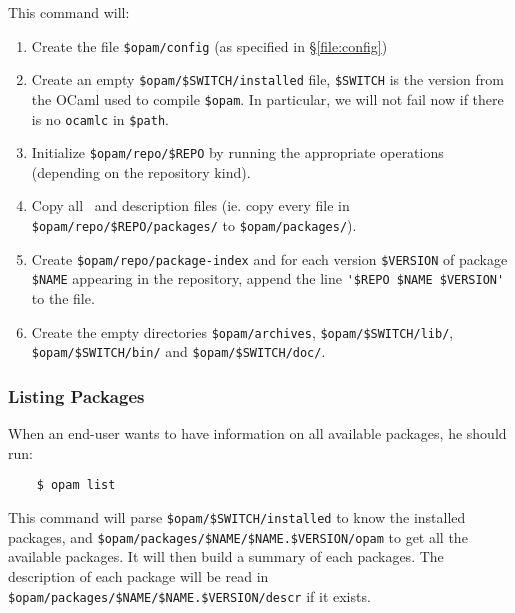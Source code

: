 \documentclass[a4paper,10pt]{article}
\begin{document}
This command will:

\begin{enumerate}

\item Create the file \verb+$opam/config+ (as specified in
  \S\ref{file:config})

\item Create an empty \verb+$opam/$SWITCH/installed+ file,
  \verb+$SWITCH+ %
  is the version from the OCaml used to compile \verb+$opam+.
  In particular, we will not fail now
  if there is no \verb+ocamlc+ in \verb+$path+.

\item Initialize \verb+$opam/repo/$REPO+ by running the
  appropriate operations (depending on the repository kind).

\item Copy all \OPAM\ and description files (ie. copy
  every file in \verb+$opam/repo/$REPO/packages/+ to
  \verb+$opam/packages/+).

\item Create \verb+$opam/repo/package-index+ and for each version
  \verb+$VERSION+ of package \verb+$NAME+ appearing in the repository,
  append the line \verb+'$REPO $NAME $VERSION'+ to the file.

\item Create the empty directories \verb+$opam/archives+,
  \verb+$opam/$SWITCH/lib/+, \verb+$opam/$SWITCH/bin/+ and \verb+$opam/$SWITCH/doc/+.

\end{enumerate}

\subsubsection{Listing Packages}
\label{opam-list}

When an end-user wants to have information on all available packages,
he should run:

\begin{verbatim}
    $ opam list
\end{verbatim}

This command will parse \verb+$opam/$SWITCH/installed+ to know the
installed packages, and
\verb+$opam/packages/$NAME/$NAME.$VERSION/opam+ to get all the
available packages. It will then build a summary of each packages. The
description of each package will be read in
\verb+$opam/packages/$NAME/$NAME.$VERSION/descr+ if it exists.
\end{document}
